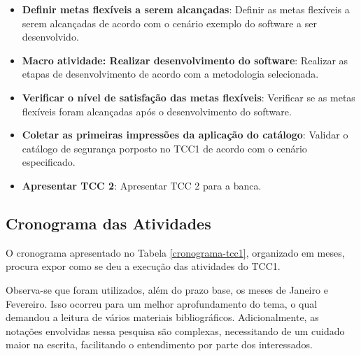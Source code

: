 \begin{itemize}
		
	\item \textbf{Definir metas flexíveis a serem alcançadas}: Definir as metas flexíveis a serem alcançadas de acordo com o cenário exemplo do software a ser desenvolvido.  
	
	\item \textbf{Macro atividade: Realizar desenvolvimento do software}: Realizar as etapas de desenvolvimento de acordo com a metodologia selecionada.
	
	\item \textbf{Verificar o nível de satisfação das metas flexíveis}: Verificar se as metas flexíveis foram alcançadas após o desenvolvimento do software.
	
	\item \textbf{Coletar as primeiras impressões da aplicação do catálogo}: Validar o catálogo de segurança porposto no TCC1 de acordo com o cenário especificado. 
	
	\item \textbf{Apresentar TCC 2}: Apresentar TCC 2 para a banca.
\end{itemize}

\subsection{Cronograma das Atividades}

O cronograma apresentado no Tabela \ref{cronograma-tcc1}, organizado em meses,  procura expor como se deu a execução das atividades do TCC1. 

Observa-se que foram utilizados, além do prazo base, os meses de Janeiro e Fevereiro. Isso ocorreu para um melhor aprofundamento do tema, o qual demandou a leitura de vários materiais bibliográficos. Adicionalmente, as notações envolvidas nessa pesquisa são complexas, necessitando de um cuidado maior na escrita, facilitando o entendimento por parte dos interessados.

